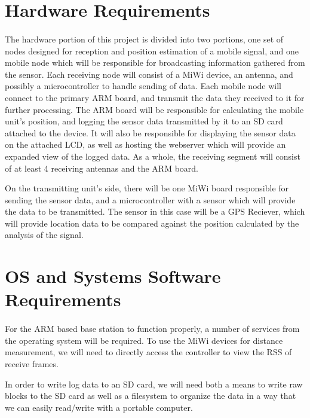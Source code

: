 \documentclass{article}
\begin{document}
\section*{Hardware Requirements}
\paragraph*{}
The hardware portion of this project is divided into two portions, one set of nodes designed for reception and position estimation of a mobile signal, and one mobile node which will be responsible for broadcasting information gathered from the sensor. Each receiving node will consist of a MiWi device, an antenna, and possibly a microcontroller to handle sending of data. Each mobile node will connect to the primary ARM board, and transmit the data they received to it for further processing. The ARM board will be responsible for calculating the mobile unit's position, and logging the sensor data transmitted by it to an SD card attached to the device. It will also be responsible for displaying the sensor data on the attached LCD, as well as hosting the webserver which will provide an expanded view of the logged data. As a whole, the receiving segment will consist of at least 4 receiving antennas and the ARM board.

On the transmitting unit's side, there will be one MiWi board responsible for sending the sensor data, and a microcontroller with a sensor which will provide the data to be transmitted. The sensor in this case will be a GPS Reciever, which will provide location data to be compared against the position calculated by the analysis of the signal.

\section*{OS and Systems Software Requirements}
\paragraph*{}
For the ARM based base station to function properly, a number of services from
the operating system will be required.  To use the MiWi devices for distance
measurement, we will need to directly access the controller to view the RSS of
receive frames.

In order to write log data to an SD card, we will need both a means to write raw
blocks to the SD card as well as a filesystem to organize the data in a way that
we can easily read/write with a portable computer. 
\end{document}
